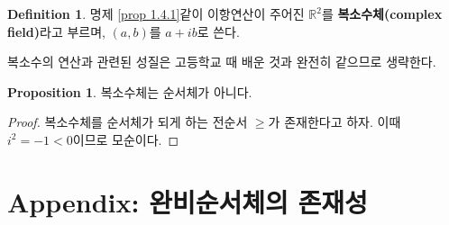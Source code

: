 \documentclass[11pt]{book}
\numberwithin{equation}{chapter}
\def\RR{\mathbb{R}}
\theoremstyle{definition}
\newtheorem{prop}[thm]{Proposition}
\newtheorem{defn}[thm]{Definition}
\begin{document}
    \begin{defn}
        명제 \ref{prop 1.4.1}\과 같이 이항연산이 주어진 \(\RR^2\)를 \textbf{복소수체(complex field)}라고 부르며, \((a, b)\)를 \(a + ib\)로 쓴다.
    \end{defn}

복소수의 연산과 관련된 성질은 고등학교 때 배운 것과 완전히 같으므로 생략한다.

    \begin{prop}
        복소수체는 순서체가 아니다.
    \end{prop}
    \begin{proof}
        복소수체를 순서체가 되게 하는 전순서 \(\ge\)가 존재한다고 하자. 이때 \(i^2 = -1 < 0\)이므로 모순이다.
    \end{proof}

\section{Appendix: 완비순서체의 존재성}
\end{document}
